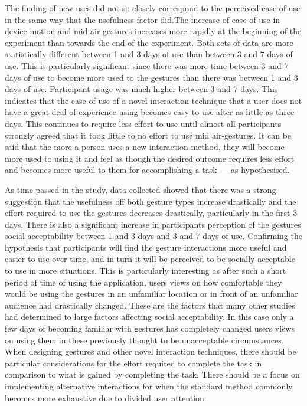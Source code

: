 \documentclass{l4proj}
\begin{document}
The finding of new uses did not so closely correspond to the perceived ease of use in the same way that the usefulness factor did.The increase of ease of use in device motion and mid air gestures increases more rapidly at the beginning of the experiment than towards the end of the experiment. Both sets of data are more statistically different between 1 and 3 days of use than between 3 and 7 days of use. This is particularly significant since there was more time between 3 and 7 days of use to become more used to the gestures than there was between 1 and 3 days of use. Participant usage was much higher between 3 and 7 days. This indicates that the ease of use of a novel interaction technique that a user does not have a great deal of experience using becomes easy to use after as little as three days. This continues to require less effort to use until almost all participants strongly agreed that it took little to no effort to use mid air-gestures. It can be said that the more a person uses a new interaction method, they will become more used to using it and feel as though the desired outcome requires less effort and becomes more useful to them for accomplishing a task --- as hypothesised.

As time passed in the study, data collected showed that there was a strong suggestion that the usefulness off both gesture types increase drastically and the effort required to use the gestures decreases drastically, particularly in the first 3 days. There is also a significant increase in participants perception of the gestures social acceptability between 1 and 3 days and 3 and 7 days of use. Confirming the hypothesis that participants will find the gesture interactions more useful and easier to use over time, and in turn it will be perceived to be socially acceptable to use in more situations. This is particularly interesting as after such a short period of time of using the application, users views on how comfortable they would be using the gestures in an unfamiliar location or in front of an unfamiliar audience had drastically changed. These are the factors that many other studies \citep{rico_usable_2010, freeman_rhythmic_2017, ahlstrom_are_2014} had determined to large factors affecting social acceptability. In this case only a few days of becoming familiar with gestures has completely changed users views on using them in these previously thought to be unacceptable circumstances. When designing gestures and other novel interaction techniques, there should be particular considerations for the effort required to complete the task in comparison to what is gained by completing the task. There should be a focus on implementing alternative interactions for when the standard method commonly becomes more exhaustive due to divided user attention.
\end{document}
